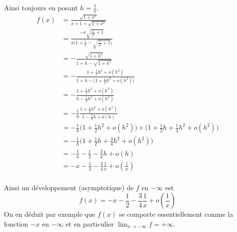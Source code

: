 \documentclass[11pt,a4paper]{article}
\begin{document}
\begin{enumerate}
Ainsi toujours en posant $h=\frac1x$.
\begin{align*}
f(x) 
  & = \frac{\sqrt{1+x^2}}{x+1+\sqrt{1+x^2}} \\
  & = \frac{-x\sqrt{\frac{1}{x^2}+1}}{x\big(1+\frac1x-\sqrt{\frac{1}{x^2}+1}\big)} \\
  & = -\frac{\sqrt{1+h^2}}{1+h-\sqrt{1+h^2}} \\
  & = -\frac{1+\frac12 h^2 + o(h^2)}{1+h - \big(1+\frac12 h^2 + o(h^2) \big)} \\
  & = - \frac{1+\frac12 h^2 + o(h^2)}{h  - \frac12 h^2 + o(h^2)} \\
  & = -\frac1h \frac{1+\frac12 h^2 + o(h^2)}{1 - \frac12 h + o(h)} \\
  & = -\frac1h \big(1+\frac12 h^2 + o(h^2)\big)\times\big(1+\frac12h +\frac14 h^2 + o(h^2) \big) \\
  & = -\frac1h\big(1 +\frac12h +\frac34 h^2 + o(h^2) \big) \\
  & =  -\frac1h -\frac12 -\frac34 h + o(h) \\
  & = -x -\frac12 -\frac34 \frac1x + o(\frac1x) \\
\end{align*}  

Ainsi un développement (asymptotique) de $f$ en $-\infty$ est 
$$f(x) = -x -\frac12 -\frac34 \frac1x + o(\frac1x)$$
On en déduit par exemple que $f(x)$ se comporte essentiellement comme la fonction $-x$
en $-\infty$ et en particulier $\lim_{x\to -\infty} f = +\infty$.
\end{enumerate}
\end{document}
